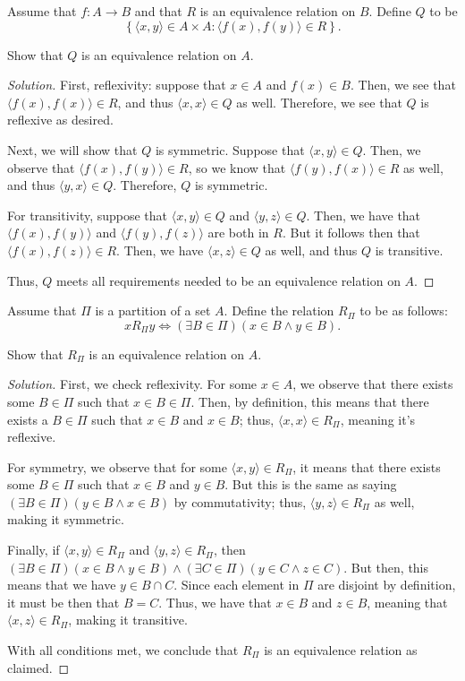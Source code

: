 \documentclass{article}
\newenvironment{solution}{\begin{proof}[Solution]}{\end{proof}}
\newcommand{\pr}[1]{\left( {#1} \right)}
\newcommand{\brc}[1]{ \left\{  {#1} \right\}}
\newcommand{\ang}[1]{\langle {#1} \rangle}
\begin{document}
	\begin{hw}{36}
		Assume that $f : A \rightarrow B$ and that $R$ is an equivalence relation on $B$. Define $Q$ to be
		\begin{equation*}
			\brc{\ang{x,y} \in A \times A : \ang{f(x), f(y)} \in R}.
		\end{equation*}
	
		Show that $Q$ is an equivalence relation on $A$.
	\end{hw}
	\begin{solution}
		First, reflexivity: suppose that $x \in A$ and $f(x) \in B$. Then, we see that $\ang{f(x), f(x)} \in R$, and thus $\ang{x,x} \in Q$ as well. Therefore, we see that $Q$ is reflexive as desired.
		
		Next, we will show that $Q$ is symmetric. Suppose that $\ang{x,y} \in Q$. Then, we observe that $\ang{f(x), f(y)} \in R$, so we know that $\ang{f(y), f(x)} \in R$ as well, and thus $\ang{y,x} \in Q$. Therefore, $Q$ is symmetric.
		
		For transitivity, suppose that $\ang{x,y} \in Q$ and $\ang{y,z} \in Q$. Then, we have that $\ang{f(x), f(y)}$ and $\ang{f(y), f(z)}$ are both in $R$. But it follows then that $\ang{f(x), f(z)} \in R$. Then, we have $\ang{x,z} \in Q$ as well, and thus $Q$ is transitive.
		
		Thus, $Q$ meets all requirements needed to be an equivalence relation on $A$.
	\end{solution}
	
	\begin{hw}{37}
		Assume that $\Pi$ is a partition of a set $A$. Define the relation $R_{\Pi}$ to be as follows:
		\begin{equation*}
			xR_{\Pi}y \iff (\exists B \in \Pi)(x \in B \land y \in B).
		\end{equation*}
	
		Show that $R_{\Pi}$ is an equivalence relation on $A$.
	\end{hw}
	\begin{solution}
		First, we check reflexivity. For some $x \in A$, we observe that there exists some $B \in \Pi$ such that $x \in B \in \Pi$. Then, by definition, this means that there exists a $B \in \Pi$ such that $x \in B$ and $x \in B$; thus, $\ang{x,x} \in R_{\Pi}$, meaning it's reflexive.
		
		For symmetry, we observe that for some $\ang{x,y} \in R_{\Pi}$, it means that there exists some $B \in \Pi$ such that $x \in B$ and $y \in B$. But this is the same as saying $\pr{\exists B \in \Pi}(y \in B \land x \in B)$ by commutativity; thus, $\ang{y,z} \in R_{\Pi}$ as well, making it symmetric.
		
		Finally, if $\ang{x,y} \in R_{\Pi}$ and $\ang{y,z} \in R_{\Pi}$, then $(\exists B \in \Pi)(x \in B \land y \in B) \land (\exists C \in \Pi)(y \in C \land z \in C)$. But then, this means that we have $y \in B \cap C$. Since each element in $\Pi$ are disjoint by definition, it must be then that $B = C$. Thus, we have that $x \in B$ and $z \in B$, meaning that $\ang{x,z} \in R_{\Pi}$, making it transitive.
		
		With all conditions met, we conclude that $R_{\Pi}$ is an equivalence relation as claimed.
	\end{solution}
\end{document}
